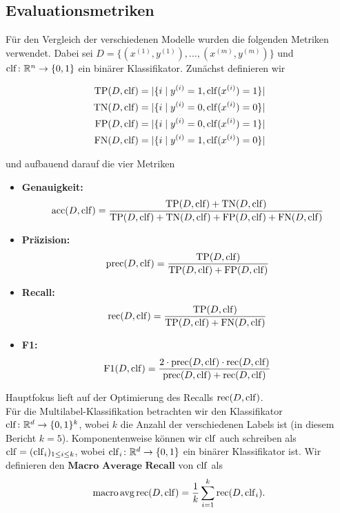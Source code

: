 \subsection{Evaluationsmetriken}
Für den Vergleich der verschiedenen Modelle wurden die folgenden Metriken verwendet. Dabei sei $D = \{(x^{(1)}, y^{(1)}), \dots, (x^{(m)}, y^{(m)})\}$ und $\operatorname{clf}\colon\mathbb{R}^n \to \{0, 1\}$ ein binärer Klassifikator. Zunächst definieren wir

\begin{align*}
    \operatorname{TP}(D, \operatorname{clf}) &= |\{i \mid y^{(i)} = 1, \operatorname{clf}(x^{(i)}) = 1\}| \\
    \operatorname{TN}(D, \operatorname{clf}) &= |\{i \mid y^{(i)} = 0, \operatorname{clf}(x^{(i)}) = 0\}| \\
    \operatorname{FP}(D, \operatorname{clf}) &= |\{i \mid y^{(i)} = 0, \operatorname{clf}(x^{(i)}) = 1\}| \\
    \operatorname{FN}(D, \operatorname{clf}) &= |\{i \mid y^{(i)} = 1, \operatorname{clf}(x^{(i)}) = 0\}|
\end{align*}

und aufbauend darauf die vier Metriken

\begin{itemize}
    \item \textbf{Genauigkeit:}
        \begin{equation*}
            \operatorname{acc}(D, \operatorname{clf}) = \frac{\operatorname{TP}(D, \operatorname{clf}) + \operatorname{TN}(D, \operatorname{clf})}{\operatorname{TP}(D, \operatorname{clf}) + \operatorname{TN}(D, \operatorname{clf}) + \operatorname{FP}(D, \operatorname{clf}) + \operatorname{FN}(D, \operatorname{clf})}
        \end{equation*}
    \item \textbf{Präzision:}
        \begin{equation*}
            \operatorname{prec}(D, \operatorname{clf}) = \frac{\operatorname{TP}(D, \operatorname{clf})}{\operatorname{TP}(D, \operatorname{clf}) + \operatorname{FP}(D, \operatorname{clf})}
        \end{equation*}
    \item \textbf{Recall:}
        \begin{equation*}
            \operatorname{rec}(D, \operatorname{clf}) = \frac{\operatorname{TP}(D, \operatorname{clf})}{\operatorname{TP}(D, \operatorname{clf}) + \operatorname{FN}(D, \operatorname{clf})}
        \end{equation*}
    \item \textbf{F1:}
        \begin{equation*}
            \operatorname{F1}(D, \operatorname{clf}) = \frac{2 \cdot \operatorname{prec}(D, \operatorname{clf}) \cdot \operatorname{rec}(D, \operatorname{clf})}{\operatorname{prec}(D, \operatorname{clf}) + \operatorname{rec}(D, \operatorname{clf})}
        \end{equation*}
\end{itemize}
Hauptfokus lieft auf der Optimierung des Recalls $\operatorname{rec}(D, \operatorname{clf})$. \\

Für die Multilabel-Klassifikation betrachten wir den Klassifikator $\operatorname{clf}\colon\mathbb{R}^d\to\{0, 1\}^k$, wobei $k$ die Anzahl der verschiedenen Labels ist (in diesem Bericht $k=5$). Komponentenweise können wir $\operatorname{clf}$ auch schreiben als $\operatorname{clf} = (\operatorname{clf}_i)_{1\leq i\leq k}$, wobei $\operatorname{clf}_i\colon\mathbb{R}^d\to\{0, 1\}$ ein binärer Klassifikator ist. Wir definieren den $\textbf{Macro Average Recall}$ von $\operatorname{clf}$ als
\begin{equation*}
    \operatorname{macro\,avg\,rec}(D, \operatorname{clf}) = \frac{1}{k}\sum_{i=1}^k\operatorname{rec} (D, \operatorname{clf}_i).
\end{equation*}

